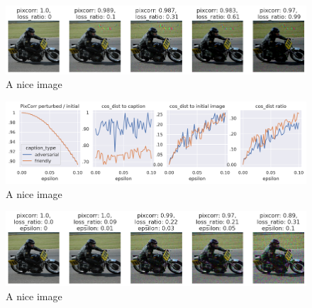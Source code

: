 \begin{figure}[ht]
    \centering
    \includegraphics[width=1\textwidth]{plots/advpert_ic_qual_validation_evolution.png}
    \caption{A nice image}\label{fig:advpert_ic_qual_validation_evolution}
\end{figure}


\begin{figure}[ht]
    \centering
    \includegraphics[width=1\textwidth]{plots/advpert_validation_fgsm_loss_curves.png}
    \caption{A nice image}\label{fig:advpert_validation_fgsm_loss_curves}
\end{figure}

\begin{figure}[ht]
    \centering
    \includegraphics[width=1\textwidth]{plots/advpert_fgsm_qual_validation_evolution.png}
    \caption{A nice image}\label{fig:advpert_fgsm_qual_validation_evolution}
\end{figure}



